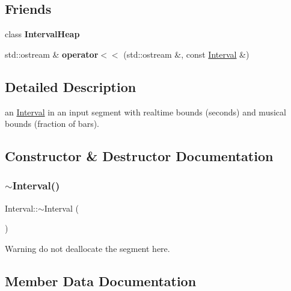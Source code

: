\subsection*{Friends}
\begin{DoxyCompactItemize}
\item 
\mbox{\label{classInterval_ac157527bf2349e36ef2475096d268e4e}} 
class {\bfseries Interval\+Heap}
\item 
\mbox{\label{classInterval_a2a9316899a6c2145d014e08437ee72d7}} 
std\+::ostream \& {\bfseries operator$<$$<$} (std\+::ostream \&, const \mbox{\hyperlink{classInterval}{Interval}} \&)
\end{DoxyCompactItemize}


\subsection{Detailed Description}
an \mbox{\hyperlink{classInterval}{Interval}} in an input segment with realtime bounds (seconds) and musical bounds (fraction of bars). 

\subsection{Constructor \& Destructor Documentation}
\mbox{\label{classInterval_a923e1717a3dedfe1ba90f81fcb26d5c5}} 
\subsubsection{\texorpdfstring{$\sim$Interval()}{~Interval()}}
{\footnotesize\ttfamily Interval\+::$\sim$\+Interval (\begin{DoxyParamCaption}{ }\end{DoxyParamCaption})\hspace{0.3cm}{\ttfamily [inline]}}

\begin{DoxyWarning}{Warning}
do not deallocate the segment here. 
\end{DoxyWarning}


\subsection{Member Data Documentation}
\mbox{\label{classInterval_a963b9b36f085a7db9c159c55608f8408}} 
